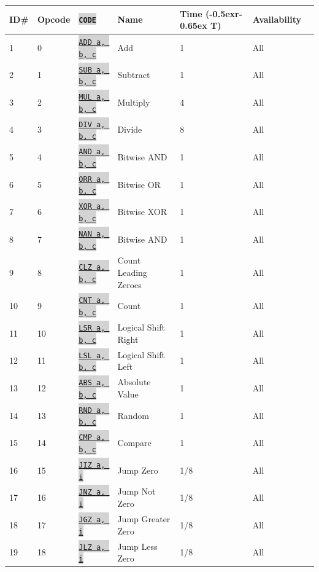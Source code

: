 \documentclass{article}
\newcommand{\vnscode}[1]{\colorbox{lightgray}{\lstinline[language=vns]{#1}}}
\newcommand{\RT}{\lower-0.5ex\hbox{r}\kern-0.65ex T}
\begin{document}
\centering
\begin{longtable}{lllllll}
    \hline ID\# & Opcode & \vnscode{CODE} & Name & Time (\RT) & Availability \\ \hline
    1 & 0 & \hyperref[table:arithmetic]{\vnscode{ADD a, b, c}} & Add & 1 & All \\
    2 & 1 & \hyperref[table:arithmetic]{\vnscode{SUB a, b, c}} & Subtract & 1 & All \\
    3 & 2 & \hyperref[table:arithmetic]{\vnscode{MUL a, b, c}} & Multiply & 4 & All \\
    4 & 3 & \hyperref[table:arithmetic]{\vnscode{DIV a, b, c}} & Divide & 8 & All \\
    5 & 4 & \hyperref[table:arithmetic]{\vnscode{AND a, b, c}} & Bitwise AND & 1 & All \\
    6 & 5 & \hyperref[table:arithmetic]{\vnscode{ORR a, b, c}} & Bitwise OR & 1 & All \\
    7 & 6 & \hyperref[table:arithmetic]{\vnscode{XOR a, b, c}} & Bitwise XOR & 1 & All \\
    8 & 7 & \hyperref[table:arithmetic]{\vnscode{NAN a, b, c}} & Bitwise AND & 1 & All \\
    9 & 8 & \hyperref[table:arithmetic]{\vnscode{CLZ a, b, c}} & Count Leading Zeroes & 1 & All \\
    10 & 9 & \hyperref[table:arithmetic]{\vnscode{CNT a, b, c}} & Count & 1 & All \\
    11 & 10 & \hyperref[table:arithmetic]{\vnscode{LSR a, b, c}} & Logical Shift Right & 1 & All \\
    12 & 11 & \hyperref[table:arithmetic]{\vnscode{LSL a, b, c}} & Logical Shift Left & 1 & All \\
    13 & 12 & \hyperref[table:arithmetic]{\vnscode{ABS a, b, c}} & Absolute Value & 1 & All \\
    14 & 13 & \hyperref[table:arithmetic]{\vnscode{RND a, b, c}} & Random & 1 & All \\
    15 & 14 & \hyperref[table:branch]{\vnscode{CMP a, b, c}} & Compare & 1 & All \\
    16 & 15 & \hyperref[table:branch]{\vnscode{JIZ a, i}} & Jump Zero & 1/8 & All \\
    17 & 16 & \hyperref[table:branch]{\vnscode{JNZ a, i}} & Jump Not Zero & 1/8 & All \\
    18 & 17 & \hyperref[table:branch]{\vnscode{JGZ a, i}} & Jump Greater Zero & 1/8 & All \\
    19 & 18 & \hyperref[table:branch]{\vnscode{JLZ a, i}} & Jump Less Zero & 1/8 & All \\

\end{longtable}
\end{document}
